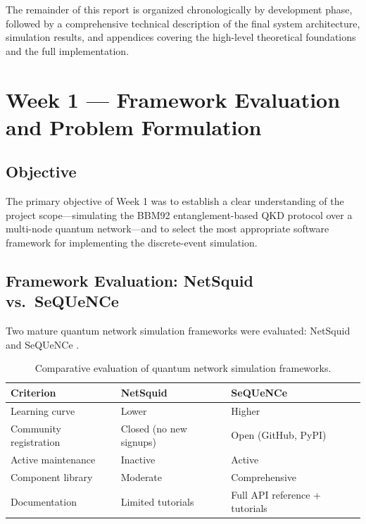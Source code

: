 \documentclass[12pt,oneside,letterpaper,english]{article}
\begin{document}
The remainder of this report is organized chronologically by development phase, followed by a comprehensive technical description of the final system architecture, simulation results, and appendices covering the high-level theoretical foundations and the full implementation.

\section{Week 1 --- Framework Evaluation and Problem Formulation}

\subsection{Objective}

The primary objective of Week 1 was to establish a clear understanding of the project scope—simulating the BBM92 entanglement-based QKD protocol over a multi-node quantum network—and to select the most appropriate software framework for implementing the discrete-event simulation.

\subsection{Framework Evaluation: NetSquid vs.\ SeQUeNCe}

Two mature quantum network simulation frameworks were evaluated: NetSquid \cite{NetSquidTutorial} and SeQUeNCe \cite{SequenceTutorial}.

\begin{table}[h!]
\centering
\caption{Comparative evaluation of quantum network simulation frameworks.}
\label{tab:frameworks}
\begin{tabular}{lll}
\toprule
\textbf{Criterion} & \textbf{NetSquid} & \textbf{SeQUeNCe} \\
\midrule
Learning curve & Lower & Higher \\
Community registration & Closed (no new signups) & Open (GitHub, PyPI) \\
Active maintenance & Inactive & Active \\
Component library & Moderate & Comprehensive \\
Documentation & Limited tutorials & Full API reference + tutorials \\
\bottomrule
\end{tabular}
\end{table}
\end{document}
